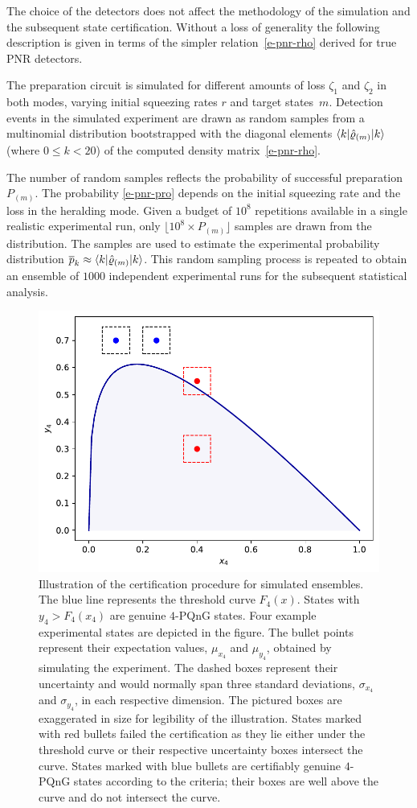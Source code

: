 \documentclass{article}
\begin{document}
The choice of the detectors does not affect the methodology of the simulation and the subsequent state certification. Without a loss of generality the following description is given in terms of the simpler relation~\eqref{e-pnr-rho} derived for true PNR detectors.

The preparation circuit is simulated for different amounts of loss $\zeta_{1}$ and $\zeta_{2}$ in both modes, varying initial squeezing rates $r$ and target states~${m}$. Detection events in the simulated experiment are drawn as random samples from a multinomial distribution bootstrapped with the diagonal elements $\braket{k|\hat{\varrho}_{(m)}|k}$ (where $0 \leq k < 20$) of the computed density matrix~\eqref{e-pnr-rho}. 

The number of random samples reflects the probability of successful preparation $P_{(m)}$. The probability \eqref{e-pnr-pro} depends on the initial squeezing rate and the loss in the heralding mode. Given a budget of $10^{8}$ repetitions available in a single realistic experimental run, only ${\lfloor 10^{8} \times P_{(m)} \rfloor}$ samples are drawn from the distribution. The samples are used to estimate the experimental probability distribution ${\overline{p}_{k} \approx \braket{k|\hat{\varrho}_{(m)}|k}}$. This random sampling process is repeated to obtain an ensemble of $1000$ independent experimental runs for the subsequent statistical analysis.

\begin{figure}[h]
  \begin{center}
    \includegraphics[width = 0.50 \columnwidth]{import/illustrate_lachman_curve.pdf}
  \end{center}
  \caption{
    Illustration of the certification procedure for simulated ensembles. The blue line represents the threshold curve $F_{4} (x)$. States with $y_{4} > F_{4}(x_{4})$ are genuine $4$-PQnG states. Four example experimental states are depicted in the figure. The bullet points represent their expectation values, $\mu_{x_{4}}$ and $\mu_{y_{4}}$, obtained by simulating the experiment. The dashed boxes represent their uncertainty and would normally span three standard deviations, $\sigma_{x_{4}}$ and $\sigma_{y_{4}}$, in each respective dimension. The pictured boxes are exaggerated in size for legibility of the illustration. States marked with red bullets failed the certification as they lie either under the threshold curve or their respective uncertainty boxes intersect the curve. States marked with blue bullets are certifiably genuine $4$-PQnG states according to the criteria; their boxes are well above the curve and do not intersect the curve.
  }
  \label{f-otm-il}
\end{figure}
\end{document}
